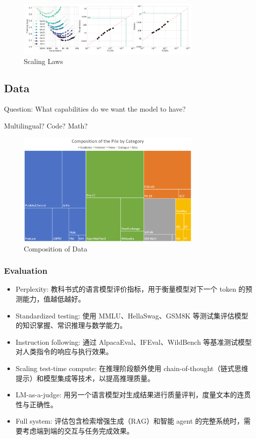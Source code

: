 \begin{figure}[ht]
  \centering
  \includegraphics[width=0.8\textwidth]{figs/lec1/lec1.09.png}
  \caption{Scaling Laws}
  \label{fig:scaling laws}
\end{figure}


\subsection{Data}

Question: What capabilities do we want the model to have?

Multilingual? Code? Math?
\begin{figure}[ht]
  \centering
  \includegraphics[width=0.8\textwidth]{figs/lec1/lec1.11.png}
  \caption{Composition of Data}
  \label{fig:data}
\end{figure}

\vspace{-3em}

\subsubsection{Evaluation}
\begin{itemize}[leftmargin=*]
  \item Perplexity: 教科书式的语言模型评价指标，用于衡量模型对下一个 token 的预测能力，值越低越好。
  \item Standardized testing: 使用 MMLU、HellaSwag、GSM8K 等测试集评估模型的知识掌握、常识推理与数学能力。
  \item Instruction following: 通过 AlpacaEval、IFEval、WildBench 等基准测试模型对人类指令的响应与执行效果。
  \item Scaling test-time compute: 在推理阶段额外使用 chain-of-thought（链式思维提示）和模型集成等技术，以提高推理质量。
  \item LM-as-a-judge: 用另一个语言模型对生成结果进行质量评判，度量文本的连贯性与正确性。
  \item Full system: 评估包含检索增强生成（RAG）和智能 agent 的完整系统时，需要考虑端到端的交互与任务完成效果。
\end{itemize}

